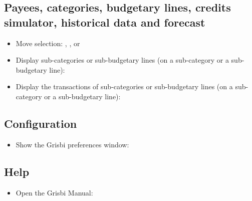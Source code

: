 \subsection{Payees, categories, budgetary lines, credits simulator, historical data and forecast}

\begin{itemize}
	\item Move selection: \keys{\arrowkeyup}, \keys{\arrowkeydown},  or 
	\item Display sub-categories or sub-budgetary lines (on a sub-category or a sub-budgetary line): \keys{{+}}
	\item Display the transactions of sub-categories or sub-budgetary lines (on a sub-category or a sub-budgetary line): 
\end{itemize}

\subsection{Configuration}

\begin{itemize}
	\item Show the Grisbi preferences window: %
\end{itemize}


\subsection{Help}

\begin{itemize}
	\item Open the Grisbi Manual: %
\end{itemize}